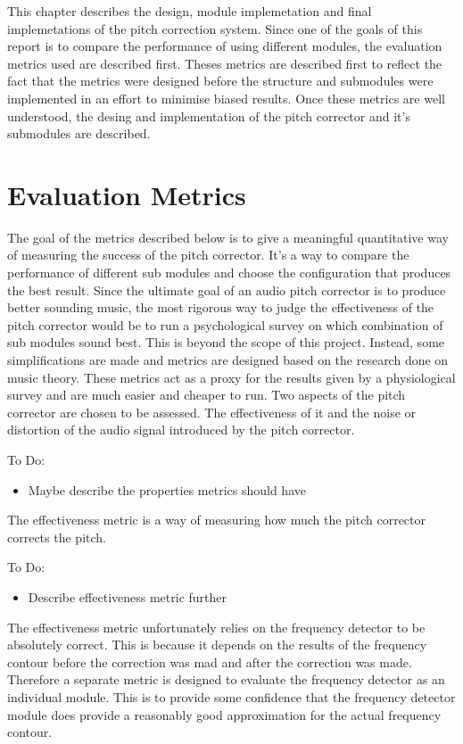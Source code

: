 
This chapter describes the design, module implemetation and final implemetations
of the pitch correction system. Since one of the goals of this report is to
compare the performance of using different modules, the evaluation metrics used
are described first. Theses metrics are described first to reflect the fact that
the metrics were designed before the structure and submodules were implemented in
an effort to minimise biased results. Once these metrics are well understood, the
desing and implementation of the pitch corrector and it's submodules are
described.

\section{Evaluation Metrics}

The goal of the metrics described below is to give a meaningful quantitative way
of measuring the success of the pitch corrector. It's a way to compare the
performance of different sub modules and choose the configuration that produces
the best result. Since the ultimate goal of an audio pitch corrector is to produce
better sounding music, the most rigorous way to judge the effectiveness of the
pitch corrector would be to run a psychological survey on which combination of sub
modules sound best. This is beyond the scope of this project. Instead, some
simplifications are made and metrics are designed based on the research done on
music theory. These metrics act as a proxy for the results given by a
physiological survey and are much easier and cheaper to run. Two aspects of the
pitch corrector are chosen to be assessed.  The effectiveness of it and the noise
or distortion of the audio signal introduced by the pitch corrector.

\color{red}
To Do:
\begin{itemize}
	\item Maybe describe the properties metrics should have
\end{itemize}
\color{black}

The effectiveness metric is a way of measuring how much the pitch corrector
corrects the pitch.

\color{red}
To Do:
\begin{itemize}
	\item Describe effectiveness metric further
\end{itemize}
\color{black}

The effectiveness metric unfortunately relies on the frequency detector to be
absolutely correct. This is because it depends on the results of the frequency
contour before the correction was mad and after the correction was made. Therefore
a separate metric is designed to evaluate the frequency detector as an individual
module.  This is to provide some confidence that the frequency detector module
does provide a reasonably good approximation for the actual frequency contour.

